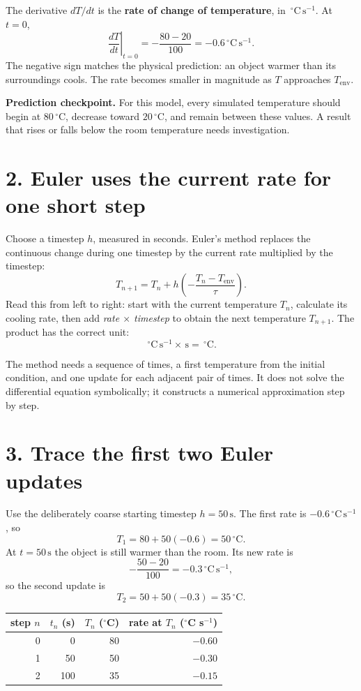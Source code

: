\documentclass[11pt,a4paper]{article}
\newcommand{\units}[1]{\,\mathrm{#1}}
\begin{document}
The derivative $dT/dt$ is the \textbf{rate of change of temperature}, in $\units{^\circ C\,s^{-1}}$. At $t=0$,
\[
\left.\frac{dT}{dt}\right|_{t=0}
=-\frac{80-20}{100}=-0.6\units{^\circ C\,s^{-1}}.
\]
The negative sign matches the physical prediction: an object warmer than its surroundings cools. The rate becomes smaller in magnitude as $T$ approaches $T_{\mathrm{env}}$.

\begin{checkbox}\textbf{Prediction checkpoint.} For this model, every simulated temperature should begin at $80\units{^\circ C}$, decrease toward $20\units{^\circ C}$, and remain between these values. A result that rises or falls below the room temperature needs investigation.\end{checkbox}

\section*{2. Euler uses the current rate for one short step}
Choose a timestep $h$, measured in seconds. Euler's method replaces the continuous change during one timestep by the current rate multiplied by the timestep:
\[
T_{n+1}=T_n+h\left(-\frac{T_n-T_{\mathrm{env}}}{\tau}\right).
\]
Read this from left to right: start with the current temperature $T_n$, calculate its cooling rate, then add \textit{rate $\times$ timestep} to obtain the next temperature $T_{n+1}$. The product has the correct unit:
\[
\units{^\circ C\,s^{-1}}\times\units{s}=\units{^\circ C}.
\]

The method needs a sequence of times, a first temperature from the initial condition, and one update for each adjacent pair of times. It does not solve the differential equation symbolically; it constructs a numerical approximation step by step.

\section*{3. Trace the first two Euler updates}
Use the deliberately coarse starting timestep $h=50\units{s}$. The first rate is $-0.6\units{^\circ C\,s^{-1}}$, so
\[
T_1=80+50(-0.6)=50\units{^\circ C}.
\]
At $t=50\units{s}$ the object is still warmer than the room. Its new rate is
\[
-\frac{50-20}{100}=-0.3\units{^\circ C\,s^{-1}},
\]
so the second update is
\[
T_2=50+50(-0.3)=35\units{^\circ C}.
\]

\begin{center}\small
\begin{tabular}{rrrr}
\toprule
step $n$ & $t_n$ (s) & $T_n$ ($^\circ$C) & rate at $T_n$ ($^\circ$C s$^{-1}$)\\
\midrule
0 & 0 & 80 & $-0.60$\\
1 & 50 & 50 & $-0.30$\\
2 & 100 & 35 & $-0.15$\\
\bottomrule
\end{tabular}
\end{center}
\end{document}
